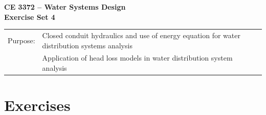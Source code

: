\documentclass[12pt]{article}
\begin{document}
\begin{center}
{\textbf{{ CE 3372 -- Water Systems Design} \\ {Exercise Set 4}}}
\end{center}
\begingroup
\begin{tabular}{p{1in} p{5in}}
Purpose: & Closed conduit hydraulics and use of energy equation for water distribution systems analysis \\
~& Application of head loss models in water distribution system analysis \\

\end{tabular}
\endgroup
\section*{\small{Exercises}}
\begin{enumerate}


\end{enumerate}
\end{document}
